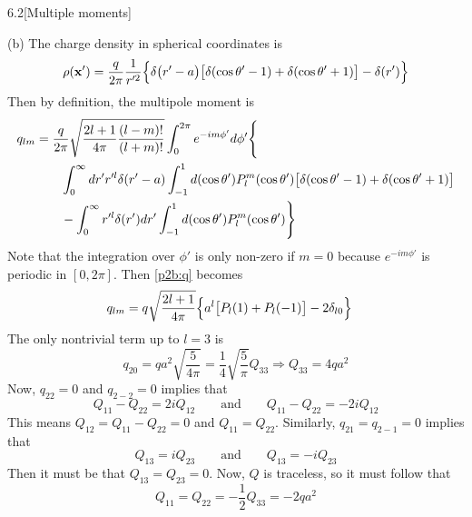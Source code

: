 \documentclass[12pt]{article}
\begin{document}
\begin{problem}{6.2}[Multiple moments]
\begin{solution}
(b) The charge density in spherical coordinates is
\begin{equation}
    \rho(\vb{x}')=\frac{q}{2\pi}\frac1{r'^2}\qty{\delta\qty(r'-a)\qty[\delta(\cos\theta'-1)+\delta(\cos\theta'+1)]-\delta(r')} 
\end{equation}
Then by definition, the multipole moment is
\begin{align}\label{p2b:q}
    q_{lm}
    &=\frac{q}{2\pi}\sqrt{\frac{2l+1}{4\pi}\frac{(l-m)!}{(l+m)!}}
    \int_0^{2\pi}e^{-im\phi'}d\phi'\Bigg\{\notag\\
    &\qquad\int_0^\infty dr'r'^l\delta(r'-a)
        \int_{-1}^1d(\cos\theta')P_l^m(\cos\theta')\qty[\delta(\cos\theta'-1)+\delta(\cos\theta'+1)]\notag\\
    &\qquad-\int_0^\infty
    r'^l\delta(r')dr'\int_{-1}^1d(\cos\theta')P_l^m(\cos\theta')
    \Bigg\}\notag\\
\end{align}
Note that the integration over $\phi'$ is only non-zero if $m=0$ because
$e^{-im\phi'}$ is periodic in $[0,2\pi]$. Then \eqref{p2b:q} becomes
\begin{align}
    q_{lm}
    &=q\sqrt{\frac{2l+1}{4\pi}}
    \qty{a^l\qty[P_l(1)+P_l(-1)]-2\delta_{l0}}
\end{align}
The only nontrivial term up to $l=3$ is
\begin{equation}
    q_{20}=qa^2\sqrt{\frac{5}{4\pi}}=\frac14\sqrt{\frac5\pi}Q_{33}\Rightarrow
    Q_{33}=4qa^2 
\end{equation}
Now, $q_{22}=0$ and $q_{2-2}=0$ implies that
\begin{equation}
    Q_{11}-Q_{22}=2iQ_{12}\qquad\text{and}\qquad
    Q_{11}-Q_{22}=-2iQ_{12}
\end{equation}
This means $Q_{12}=Q_{11}-Q_{22}=0$ and $Q_{11}=Q_{22}$. Similarly,
$q_{21}=q_{2-1}=0$ implies that
\begin{equation}
    Q_{13}=iQ_{23}\qquad\text{and}\qquad
    Q_{13}=-iQ_{23}
\end{equation}
Then it must be that $Q_{13}=Q_{23}=0$. Now, $Q$ is traceless, so it must
follow that
\begin{equation}
    Q_{11}=Q_{22}=-\frac12Q_{33}=-2qa^2 
\end{equation}


\end{solution}
\end{problem}
\end{document}
